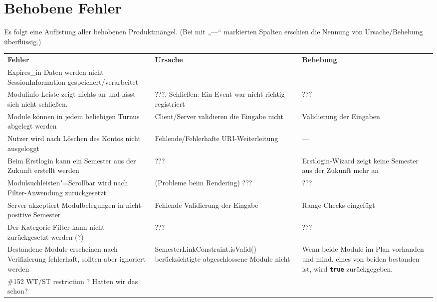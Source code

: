 \FloatBarrier
\section{Behobene Fehler}

Es folgt eine Auflistung aller behobenen Produktmängel. (Bei mit „---“ markierten Spalten erschien die Nennung von Ursache/Behebung überflüssig.)


\begin{longtable}{| >{\hspace{0pt}} p{} | >{\hspace{0pt}} p{} | >{\hspace{0pt}} p{} | }
	\hline
	\textbf{Fehler} & \textbf{Ursache}  & \textbf{Behebung} \\ 
	\hhline{|=|=|=|}
	\endfirsthead
	\endhead
	Expires\_in-Daten werden nicht SessionInformation gespeichert/verarbeitet & --- & --- \\
	\hline
	Modulinfo-Leiste zeigt nichts an und lässt sich nicht schließen. & ???, Schließen: Ein Event war nicht richtig registriert & ??? \\
	\hline
	Module können in jedem beliebigen Turnus abgelegt werden & Client/Server validieren die Eingabe nicht & Validierung der Eingaben \\
	\hline
	Nutzer wird nach Löschen des Kontos nicht ausgeloggt & Fehlende/Fehlerhafte URI-Weiterleitung & --- \\
	\hline
	Beim Erstlogin kann ein Semester aus der Zukunft erstellt werden & ??? & Erstlogin-Wizard zeigt keine Semester aus der Zukunft mehr an \\
	\hline
	Modulsuchleisten"=Scrollbar wird nach Filter-Anwendung zurückgesetzt & (Probleme beim Rendering) ??? & ??? \\
	\hline
	Server akzeptiert Modulbelegungen in nicht-positive Semester & Fehlende Validierung der Eingabe & Range-Checks eingefügt \\
	\hline
	Der Kategorie-Filter kann nicht zurückgesetzt werden (?) & ??? & ??? \\
	\hline
	Bestandene Module erscheinen nach Verifizierung fehlerhaft, sollten aber ignoriert werden & SemesterLinkConstraint.isValid() berücksichtigte abgeschlossene Module nicht & Wenn beide Module im Plan vorhanden und mind. eines von beiden bestanden ist, wird \texttt{\textbf{true}} zurückgegeben. \\
	\hline
	\#152 WT/ST restriction ? Hatten wir das schon? & & \\

\end{longtable}
